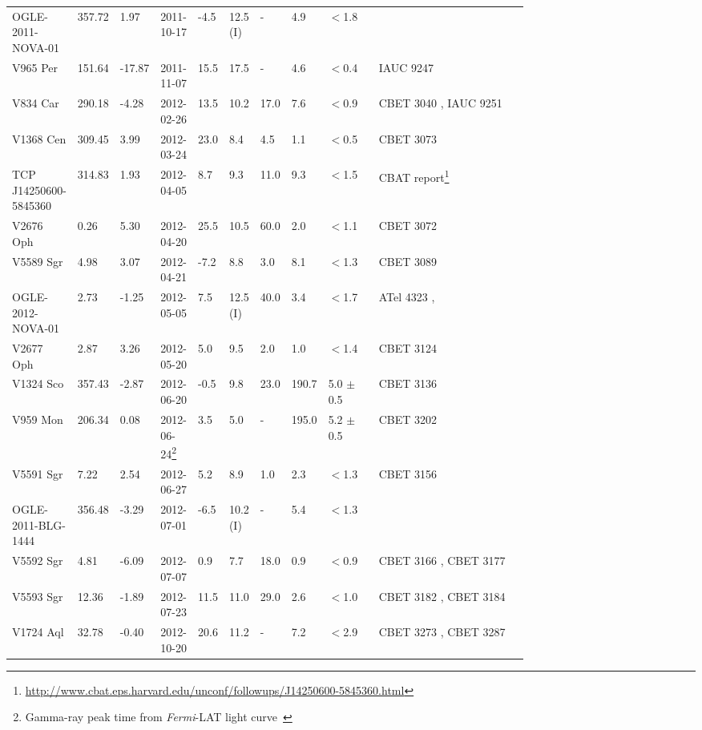 \documentclass{aa} %
\newcommand{\Fermi}{\textit{Fermi}}
\begin{document}
\begin{landscape}
\begin{tiny}
\begin{longtable*}{ L{0.07\linewidth} p{0.03\linewidth}  p{0.04\linewidth} p{0.07\linewidth} p{0.03\linewidth} p{0.04\linewidth} p{0.04\linewidth} p{0.03\linewidth} p{0.1\linewidth}  L{0.3\linewidth} }
OGLE-2011-NOVA-01 & 357.72 & 1.97 & 2011-10-17 & -4.5 & 12.5 (I) & - & 4.9 & $<$1.8 & \citep{OGLEREF2}\\
V965 Per & 151.64 & -17.87 & 2011-11-07 & 15.5 & 17.5 & - & 4.6 & $<$0.4 & IAUC 9247 \citep{IAUC9247}\\
V834 Car & 290.18 & -4.28 & 2012-02-26 & 13.5 & 10.2 & 17.0 & 7.6 & $<$0.9 & CBET 3040 \citep{CBET3040}, IAUC 9251 \citep{IAUC9251}\\
V1368 Cen & 309.45 & 3.99 & 2012-03-24 & 23.0 & 8.4 & 4.5 & 1.1 & $<$0.5 & CBET 3073 \citep{CBET3073}\\
TCP J14250600-5845360 & 314.83 & 1.93 & 2012-04-05 & 8.7 & 9.3 & 11.0 & 9.3 & $<$1.5 & CBAT report\footnote{\url{http://www.cbat.eps.harvard.edu/unconf/followups/J14250600-5845360.html}}\\
V2676 Oph & 0.26 & 5.30 & 2012-04-20 & 25.5 & 10.5 & 60.0 & 2.0 & $<$1.1 & CBET 3072 \citep{CBET3072}\\
V5589 Sgr & 4.98 & 3.07 & 2012-04-21 & -7.2 & 8.8 & 3.0 & 8.1 & $<$1.3 & CBET 3089 \citep{CBET3089}\\
OGLE-2012-NOVA-01 & 2.73 & -1.25 & 2012-05-05 & 7.5 & 12.5 (I) & 40.0 & 3.4 & $<$1.7 & ATel 4323 \citep{ATel4323},\citep{ OGLEREF2}\\
V2677 Oph & 2.87 & 3.26 & 2012-05-20 & 5.0 & 9.5 & 2.0 & 1.0 & $<$1.4 & CBET 3124 \citep{CBET3124}\\
V1324 Sco & 357.43 & -2.87 & 2012-06-20 & -0.5 & 9.8 & 23.0 & 190.7 & 5.0 $\pm$ 0.5 & CBET 3136 \citep{CBET3136}\\
V959 Mon & 206.34 & 0.08 & 2012-06-24\footnote{Gamma-ray peak time from \Fermi-LAT light curve~\citep{2014Sci...345..554A}} & 3.5 & 5.0 & - & 195.0 & 5.2 $\pm$ 0.5 & CBET 3202 \citep{CBET3202}\\
V5591 Sgr & 7.22 & 2.54 & 2012-06-27 & 5.2 & 8.9 & 1.0 & 2.3 & $<$1.3 & CBET 3156 \citep{CBET3156}\\
OGLE-2011-BLG-1444 & 356.48 & -3.29 & 2012-07-01 & -6.5 & 10.2 (I) & - & 5.4 & $<$1.3 & \citep{OGLEREF1}\\
V5592 Sgr & 4.81 & -6.09 & 2012-07-07 & 0.9 & 7.7 & 18.0 & 0.9 & $<$0.9 & CBET 3166 \citep{CBET3166}, CBET 3177 \citep{CBET3177}\\
V5593 Sgr & 12.36 & -1.89 & 2012-07-23 & 11.5 & 11.0 & 29.0 & 2.6 & $<$1.0 & CBET 3182 \citep{CBET3182}, CBET 3184 \citep{CBET3184}\\
V1724 Aql & 32.78 & -0.40 & 2012-10-20 & 20.6 & 11.2 & - & 7.2 & $<$2.9 & CBET 3273 \citep{CBET3273}, CBET 3287 \citep{CBET3287}\\

\end{longtable*}
\end{tiny}
\end{landscape}
\end{document}
